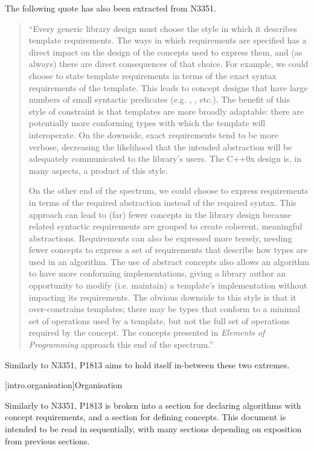 The following quote has also been extracted from N3351.

\begin{quote}
``Every generic library design must choose the style in which it describes template requirements.
The ways in which requirements are specified has a direct impact on the design of the concepts
used to express them, and (as always) there are direct consequences of that choice. For example,
we could choose to state template requirements in terms of the exact syntax requirements of the
template. This leads to concept designs that have large numbers of small syntactic predicates (e.g.
, , etc.). The benefit of this style of constraint is that templates
are more broadly adaptable: there are potentially more conforming types with which the template will
interoperate. On the downside, exact requirements tend to be more verbose, decreasing the
likelihood that the intended abstraction will be adequately communicated to the library’s users.
The C++0x design is, in many aspects, a product of this style.

On the other end of the spectrum, we could choose to express requirements in terms of the required
abstraction instead of the required syntax. This approach can lead to (far) fewer concepts in the
library design because related syntactic requirements are grouped to create coherent, meaningful
abstractions. Requirements can also be expressed more tersely, needing fewer concepts to express a
set of requirements that describe how types are used in an algorithm. The use of abstract concepts
also allows an algorithm to have more conforming implementations, giving a library author an
opportunity to modify (i.e. maintain) a template's implementation without impacting its
requirements. The obvious downside to this style is that it over-constrains templates; there may
be types that conform to a minimal set of operations used by a template, but not the full set of
operations required by the concept. The concepts presented in \textit{Elements of Programming}
approach this end of the spectrum.''
\end{quote}

Similarly to N3351, P1813 aims to hold itself in-between these two extremes.

[intro.organisation]{Organisation}

Similarly to N3351, P1813 is broken into a section for declaring algorithms with concept
requirements, and a section for defining concepts. This document is intended to be read in
sequentially, with many sections depending on exposition from previous sections.

